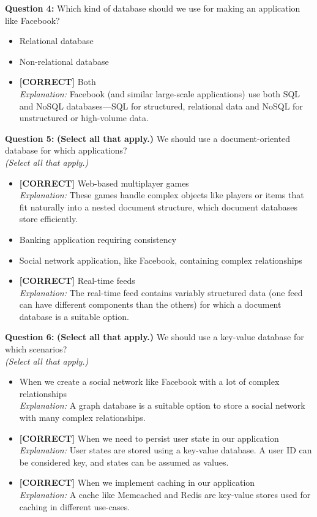 \vspace{0.3cm}
\noindent
\textbf{Question 4:} Which kind of database should we use for making an application like Facebook?
\\[0.2cm]
\begin{itemize}
 \item Relational database
 \item Non-relational database
 \item \textbf{[CORRECT]} Both
\\[0.1cm]
\textit{Explanation:} 
Facebook (and similar large-scale applications) use both SQL and NoSQL databases---SQL for structured, relational data and NoSQL for unstructured or high-volume data.
\end{itemize}
\vspace{0.3cm}
\noindent
\textbf{Question 5:} \textbf{(Select all that apply.)} We should use a document-oriented database for which applications?
\\
\textit{(Select all that apply.)}
\\[0.2cm]
\begin{itemize}
 \item \textbf{[CORRECT]} Web-based multiplayer games
\\[0.1cm]
\textit{Explanation:} 
These games handle complex objects like players or items that fit naturally into a nested document structure, which document databases store efficiently.
 \item Banking application requiring consistency
 \item Social network application, like Facebook, containing complex relationships
 \item \textbf{[CORRECT]} Real-time feeds
\\[0.1cm]
\textit{Explanation:} 
The real-time feed contains variably structured data (one feed can have different components than the others) for which a document database is a suitable option.
\end{itemize}
\vspace{0.3cm}
\noindent
\textbf{Question 6:} \textbf{(Select all that apply.)} We should use a key-value database for which scenarios?
\\
\textit{(Select all that apply.)}
\\[0.2cm]
\begin{itemize}
 \item When we create a social network like Facebook with a lot of complex relationships
\\[0.1cm]
\textit{Explanation:} 
A graph database is a suitable option to store a social network with many complex relationships.
 \item \textbf{[CORRECT]} When we need to persist user state in our application
\\[0.1cm]
\textit{Explanation:} 
User states are stored using a key-value database. A user ID can be considered key, and states can be assumed as values.
 \item \textbf{[CORRECT]} When we implement caching in our application
\\[0.1cm]
\textit{Explanation:} 
A cache like Memcached and Redis are key-value stores used for caching in different use-cases.
\end{itemize}



